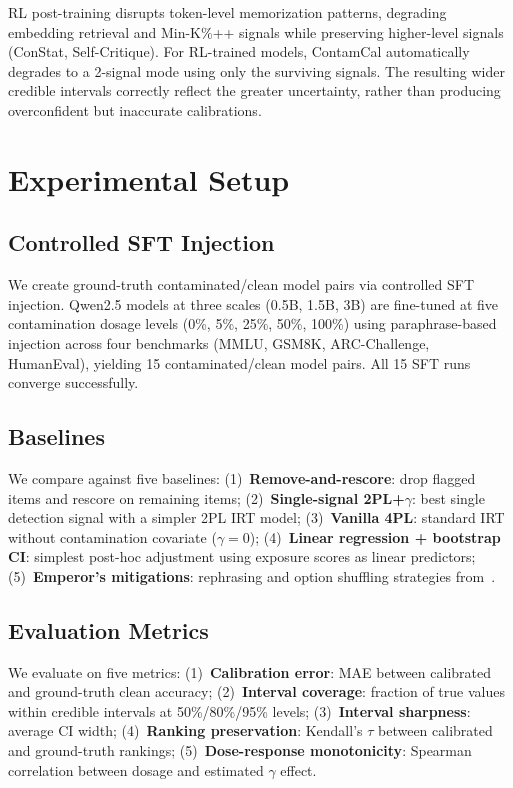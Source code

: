 \documentclass[11pt,letterpaper]{article}
\begin{document}
RL post-training disrupts token-level memorization patterns, degrading embedding retrieval and Min-K\%++ signals while preserving higher-level signals (ConStat, Self-Critique).
For RL-trained models, ContamCal automatically degrades to a 2-signal mode using only the surviving signals.
The resulting wider credible intervals correctly reflect the greater uncertainty, rather than producing overconfident but inaccurate calibrations.

\section{Experimental Setup}

\subsection{Controlled SFT Injection}
\label{sec:sft-injection}

We create ground-truth contaminated/clean model pairs via controlled SFT injection.
Qwen2.5 models at three scales (0.5B, 1.5B, 3B) are fine-tuned at five contamination dosage levels (0\%, 5\%, 25\%, 50\%, 100\%) using paraphrase-based injection across four benchmarks (MMLU, GSM8K, ARC-Challenge, HumanEval), yielding 15 contaminated/clean model pairs.
All 15 SFT runs converge successfully.

\subsection{Baselines}

We compare against five baselines:
(1)~\textbf{Remove-and-rescore}: drop flagged items and rescore on remaining items;
(2)~\textbf{Single-signal 2PL+$\gamma$}: best single detection signal with a simpler 2PL IRT model;
(3)~\textbf{Vanilla 4PL}: standard IRT without contamination covariate ($\gamma=0$);
(4)~\textbf{Linear regression + bootstrap CI}: simplest post-hoc adjustment using exposure scores as linear predictors;
(5)~\textbf{Emperor's mitigations}: rephrasing and option shuffling strategies from~\citet{dong2024emperor}.

\subsection{Evaluation Metrics}

We evaluate on five metrics:
(1)~\textbf{Calibration error}: MAE between calibrated and ground-truth clean accuracy;
(2)~\textbf{Interval coverage}: fraction of true values within credible intervals at 50\%/80\%/95\% levels;
(3)~\textbf{Interval sharpness}: average CI width;
(4)~\textbf{Ranking preservation}: Kendall's $\tau$ between calibrated and ground-truth rankings;
(5)~\textbf{Dose-response monotonicity}: Spearman correlation between dosage and estimated $\gamma$ effect.
\end{document}
